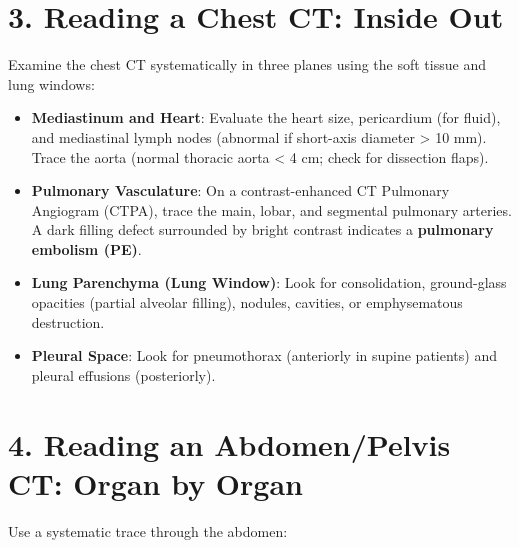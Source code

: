 \section*{3. Reading a Chest CT: Inside Out}
Examine the chest CT systematically in three planes using the soft tissue and lung windows:

\begin{itemize}
    \item \textbf{Mediastinum and Heart}: Evaluate the heart size, pericardium (for fluid), and mediastinal lymph nodes (abnormal if short-axis diameter > 10 mm). Trace the aorta (normal thoracic aorta < 4 cm; check for dissection flaps).
    \item \textbf{Pulmonary Vasculature}: On a contrast-enhanced CT Pulmonary Angiogram (CTPA), trace the main, lobar, and segmental pulmonary arteries. A dark filling defect surrounded by bright contrast indicates a \textbf{pulmonary embolism (PE)}.
    \item \textbf{Lung Parenchyma (Lung Window)}: Look for consolidation, ground-glass opacities (partial alveolar filling), nodules, cavities, or emphysematous destruction.
    \item \textbf{Pleural Space}: Look for pneumothorax (anteriorly in supine patients) and pleural effusions (posteriorly).
\end{itemize}


\section*{4. Reading an Abdomen/Pelvis CT: Organ by Organ}
Use a systematic trace through the abdomen:

